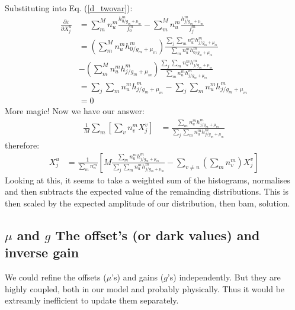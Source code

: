\documentclass[11pt]{article}
\begin{document}
Substituting into Eq. (\ref{d_twovar}):
\begin{align}
   \frac{\partial \varepsilon}{\partial X^u_j} &= \sum_m^M n^m_u \frac{ h^m_{0/g_m+\mu_m}}{f^m_0}- \sum_m^M n^m_u \frac{ h^m_{j/g_m+\mu_m}}{f^m_j} \\
   &=  \left(\sum_m^M n^m_u h^m_{0/g_m+\mu_m}\right) \frac{\sum_{j}\sum_m n^m_u h^m_{j/g_m+\mu_m}}{\sum_m n^m_u h^m_{0/g_m+\mu_m}} \\
   & - \left(\sum_m^M n^m_u h^m_{j/g_m+\mu_m}\right) \frac{\sum_{j}\sum_m n^m_u h^m_{j/g_m+\mu_m}}{\sum_m n^m_u h^m_{j/g_m+\mu_m}} \\
   &= \sum_{j}\sum_m n^m_u h^m_{j/g_m+\mu_m} - \sum_{j}\sum_m n^m_u h^m_{j/g_m+\mu_m} \\
   &= 0
\end{align}
More magic! Now we have our answer:
\begin{align}
   \frac{1}{M}\sum_m \left[ \sum_v n^m_v X^v_j \right] &= \frac{\sum_m n^m_u h^m_{j/g_m+\mu_m}}{\sum_{j}\sum_m n^m_u h^m_{j/g_m+\mu_m}}
\end{align}
therefore:
\begin{align}
   X^u_j &= \frac{1}{\sum_m n^m_u}\left[M\frac{\sum_m n^m_u h^m_{j/g_m+\mu_m}}{\sum_{j}\sum_m n^m_u h^m_{j/g_m+\mu_m}} - \sum_{v\neq u} (\sum_m n^m_v) X^v_j \right] 
\end{align}
Looking at this, it seems to take a weighted sum of the histograms, normalises and then subtracts the expected value of the remainding distributions. This is then scaled by the expected amplitude of our distribution, then bam, solution.















\subsection{$\mu$ and $g$ The offset's (or dark values) and inverse gain}
We could refine the offsets ($\mu$'s) and gains ($g$'s) independently. But they are highly coupled, both in our model and probably physically. Thus it would be extreamly inefficient to update them separately.
\end{document}
